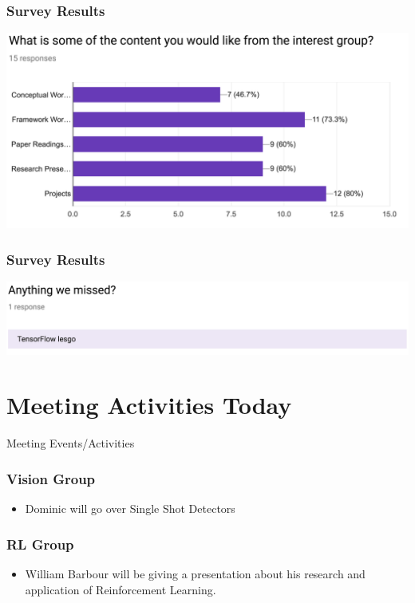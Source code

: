 \documentclass{beamer}
\begin{document}
\begin{frame}
  \frametitle{Survey Results}
  \begin{center}
    \includegraphics[width=0.8\linewidth]{feedback5.png}
  \end{center}
\end{frame}

\begin{frame}
  \frametitle{Survey Results}
  \begin{center}
    \includegraphics[width=0.8\linewidth]{feedback6.png}
  \end{center}
\end{frame}

\section{Meeting Activities Today}
\begin{frame}
  \huge{\centerline{Meeting Events/Activities}}
\end{frame}
\begin{frame}
  \frametitle{Vision Group}
  \begin{itemize}
  \item Dominic will go over Single Shot Detectors
  \end{itemize}
\end{frame}

\begin{frame}
  \frametitle{RL Group}
  \begin{itemize}
  \item William Barbour will be giving a presentation about his research and application of Reinforcement Learning.
  \end{itemize}
\end{frame}
\end{document}

